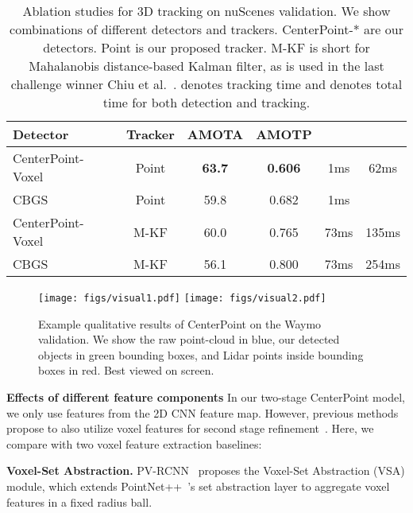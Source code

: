 \documentclass[final]{cvpr}
\begin{document}
\begin{table}[t]
\small
\begin{center}
\begin{tabular}{@{}l@{\ }c@{\ }c@{\ }c@{\ }c@{\ }c@{}}
  \toprule
  Detector & Tracker & AMOTA & AMOTP  &  & \\
  \midrule
 CenterPoint-Voxel & Point & \textbf{63.7} & \textbf{0.606} & 1ms & 62ms\\ 
 CBGS~\cite{zhu2019classbalanced} & Point & 59.8 & 0.682 & 1ms &  \\
 CenterPoint-Voxel & M-KF & 60.0 & 0.765 & 73ms & 135ms   \\ 
  CBGS~\cite{zhu2019classbalanced} & M-KF & 56.1 & 0.800 & 73ms & 254ms \\
  \bottomrule 
\end{tabular}
\end{center}
\vspace{-5mm}
\caption{Ablation studies for 3D tracking on nuScenes validation. We show combinations of different detectors and trackers. CenterPoint-* are our detectors. Point is our proposed tracker. M-KF is short for Mahalanobis distance-based Kalman filter, as is used in the last challenge winner Chiu et al.~\cite{chiu2020probabilistic}.  denotes tracking time and  denotes total time for both detection and tracking.}
\vspace{-5mm}
\end{table}

\begin{figure*}[t]
\small 
\centering 
\texttt{[image: figs/visual1.pdf]} 
\texttt{[image: figs/visual2.pdf]} 
\caption{Example qualitative results of CenterPoint on the Waymo validation. We show the raw point-cloud in blue, our detected objects in green bounding boxes, and Lidar points inside bounding boxes in red. Best viewed on screen. }
\end{figure*}


\noindent 
\textbf{Effects of different feature components}
In our two-stage CenterPoint model, we only use features from the 2D CNN feature map. 
However, previous methods propose to also utilize voxel features for second stage refinement~\cite{pvrcnn, PartA}. 
Here, we compare with two voxel feature extraction baselines:

\textbf{Voxel-Set Abstraction.}
PV-RCNN~\cite{pvrcnn} proposes the Voxel-Set Abstraction (VSA) module, which extends PointNet++~\cite{qi2017pointnet++}'s set abstraction layer to aggregate voxel features in a fixed radius ball.
\end{document}
